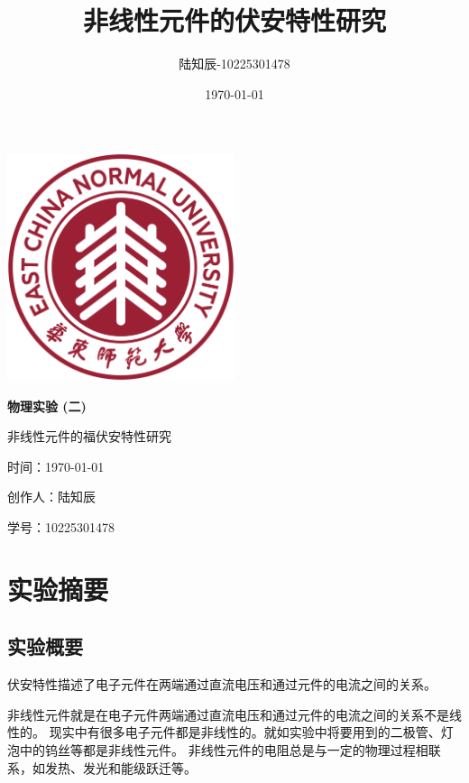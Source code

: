 \documentclass{ctexart}
\title{非线性元件的伏安特性研究}
\author{陆知辰-10225301478}
\date{\today}
\begin{document}
\begin{titlepage}
  \centering
  \includegraphics[width=0.5\textwidth]{ecnu.png}
  
  \vspace*{\baselineskip}
  
  \Huge\textbf{物\quad 理\quad 实\quad 验 \quad (二)}
  \vspace*{0.3\baselineskip}
  
  \huge 非线性元件的福伏安特性研究
  
  \vspace*{2\baselineskip}
  
  \large 时间：\today
  
  \vspace*{\baselineskip}
  
  \large 创作人：陆知辰
  
  \vspace*{\baselineskip}
  
  \large 学号：10225301478
  
\end{titlepage}
\newpage
\tableofcontents
\newpage
\section{实验摘要}
  \subsection{实验概要}
  伏安特性描述了电子元件在两端通过直流电压和通过元件的电流之间的关系。

  非线性元件就是在电子元件两端通过直流电压和通过元件的电流之间的关系不是线性的。
  现实中有很多电子元件都是非线性的。就如实验中将要用到的二极管、灯泡中的钨丝等都是非线性元件。
  非线性元件的电阻总是与一定的物理过程相联系，如发热、发光和能级跃迁等。
\end{document}
